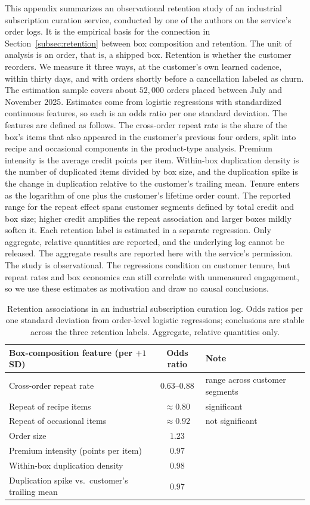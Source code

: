 \documentclass[11pt]{article}
\theoremstyle{definition}
\theoremstyle{remark}
\newcommand{\1}{\mathbf{1}}
\begin{document}
This appendix summarizes an observational retention study of an
industrial subscription curation service, conducted by one of the
authors on the service's order logs. It is the empirical basis for the
connection in Section~\ref{subsec:retention} between box composition and
retention. The unit of analysis is an order, that is, a shipped box.
Retention is whether the customer reorders. We measure it three ways, at
the customer's own learned cadence, within thirty days, and with orders
shortly before a cancellation labeled as churn. The estimation sample covers about \(52{,}000\) orders placed between
July and November 2025. Estimates come from logistic regressions with
standardized continuous features, so each is an odds ratio per one
standard deviation. The features are defined as follows. The cross-order
repeat rate is the share of the box's items that also appeared in the
customer's previous four orders, split into recipe and occasional
components in the product-type analysis. Premium intensity is the
average credit points per item. Within-box duplication density is the
number of duplicated items divided by box size, and the duplication
spike is the change in duplication relative to the customer's trailing
mean. Tenure enters as the logarithm of one plus the customer's lifetime
order count. The reported range for the repeat effect spans customer
segments defined by total credit and box size; higher credit amplifies
the repeat association and larger boxes mildly soften it. Each retention
label is estimated in a separate regression. Only aggregate, relative quantities are reported, and the underlying log
cannot be released. The aggregate results are reported here with the
service's permission.
The study is observational. The regressions condition on customer
tenure, but repeat rates and box economics can still correlate with
unmeasured engagement, so we use these estimates as motivation and draw no causal conclusions.

\begin{table}[h!]
\centering
\scriptsize
\setlength{\tabcolsep}{5pt}
\begin{tabular}{lcl}
\toprule
Box-composition feature (per $+1$ SD) & Odds ratio & Note \\
\midrule
Cross-order repeat rate & $0.63$--$0.88$ & range across customer segments \\
Repeat of recipe items & $\approx 0.80$ & significant \\
Repeat of occasional items & $\approx 0.92$ & not significant \\
Order size & $1.23$ & \\
Premium intensity (points per item) & $0.97$ & \\
Within-box duplication density & $0.98$ & \\
Duplication spike vs.\ customer's trailing mean & $0.97$ & \\
\bottomrule
\end{tabular}
\caption{Retention associations in an industrial subscription curation log. Odds ratios per one standard deviation from order-level logistic regressions; conclusions are stable across the three retention labels. Aggregate, relative quantities only.}
\label{tab:retention-drivers}
\end{table}
\end{document}
